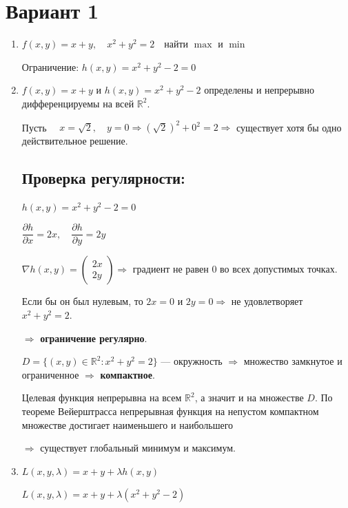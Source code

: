 \documentclass[12pt, a4paper]{article}
\begin{document}
\section*{Вариант 1}

\begin{enumerate}
    \item $f(x,y) = x + y, \quad x^2 + y^2 = 2 \quad \text{найти } \max \text{ и } \min$
    
    Ограничение: $h(x,y) = x^2 + y^2 - 2 = 0$

    \item $f(x,y) = x + y$ и $h(x,y) = x^2 + y^2 - 2$ определены и непрерывно дифференцируемы на всей $\mathbb{R}^2$.
    
    Пусть $\quad x = \sqrt{2}, \quad y = 0 \Rightarrow (\sqrt{2})^2 + 0^2 = 2 \Rightarrow$ существует хотя бы одно действительное решение.

    \subsection*{Проверка регулярности:}
    $h(x,y) = x^2 + y^2 - 2 = 0$
    
    $\dfrac{\partial h}{\partial x} = 2x, \quad \dfrac{\partial h}{\partial y} = 2y$
    
    $\nabla h(x,y) = \begin{pmatrix} 2x \\ 2y \end{pmatrix} \Rightarrow$ градиент не равен 0 во всех допустимых точках.
    
    Если бы он был нулевым, то $2x = 0$ и $2y = 0 \Rightarrow$ не удовлетворяет $x^2 + y^2 = 2$.
    
    $\Rightarrow$ \textbf{ограничение регулярно}.

    \vspace{0.5cm}
    $D = \{(x,y) \in \mathbb{R}^2 : x^2 + y^2 = 2\}$ — окружность $\Rightarrow$ множество замкнутое и ограниченное $\Rightarrow$ \textbf{компактное}.
    
    Целевая функция непрерывна на всем $\mathbb{R}^2$, а значит и на множестве $D$. По теореме Вейерштрасса непрерывная функция на непустом компактном множестве достигает наименьшего и наибольшего
    
    $\Rightarrow$ существует глобальный минимум и максимум.

    \item $L(x,y,\lambda) = x + y + \lambda h(x,y)$
    
    $L(x,y,\lambda) = x + y + \lambda (x^2 + y^2 - 2)$


\end{enumerate}
\end{document}
